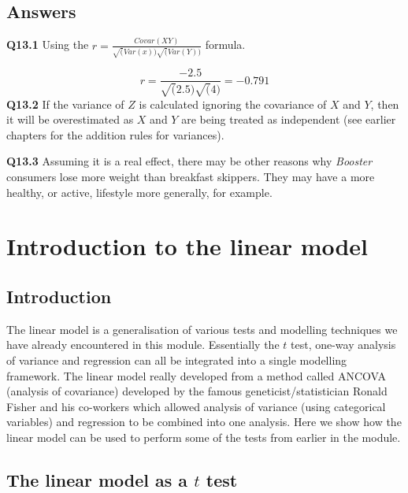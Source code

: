 \documentclass[
  oneside]{krantz}
\begin{document}
\hypertarget{ANScorreg}{%
\section{Answers}\label{ANScorreg}}

\textbf{Q13.1} Using the \(r= \frac{Covar(XY)}{\sqrt(Var(x))\sqrt(Var(Y))}\) formula.

\[r= \frac{-2.5}{\sqrt(2.5)\sqrt(4)} = -0.791\]
\textbf{Q13.2} If the variance of \(Z\) is calculated ignoring the covariance of \(X\) and \(Y\), then it will be overestimated as \(X\) and \(Y\) are being treated as independent (see earlier chapters for the addition rules for variances).

\textbf{Q13.3} Assuming it is a real effect, there may be other reasons why \emph{Booster} consumers lose more weight than breakfast skippers. They may have a more healthy, or active, lifestyle more generally, for example.

\hypertarget{introlm}{%
\chapter{Introduction to the linear model}\label{introlm}}

\hypertarget{INTlm}{%
\section{Introduction}\label{INTlm}}

The linear model is a generalisation of various tests and modelling techniques we have already encountered in this module. Essentially the \(t\) test, one-way analysis of variance and regression can all be integrated into a single modelling framework. The linear model really developed from a method called ANCOVA (analysis of covariance) developed by the famous geneticist/statistician Ronald Fisher and his co-workers \citeyearpar{Eden&Fisher1927} which allowed analysis of variance (using categorical variables) and regression to be combined into one analysis. Here we show how the linear model can be used to perform some of the tests from earlier in the module.

\hypertarget{the-linear-model-as-a-t-test}{%
\section{\texorpdfstring{The linear model as a \(t\) test}{The linear model as a t test}}\label{the-linear-model-as-a-t-test}}
\end{document}
